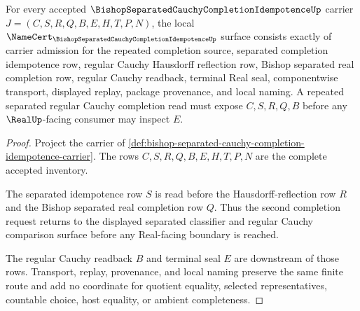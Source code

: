 \begin{theorem}
\label{thm:bishop-separated-cauchy-completion-idempotence-namecert-obligations}
For every accepted $\BishopSeparatedCauchyCompletionIdempotenceUp$ carrier $J=(C,S,R,Q,B,E,H,T,P,N)$, the local $\NameCert_{\BishopSeparatedCauchyCompletionIdempotenceUp}$ surface consists exactly of carrier admission for the repeated completion source, separated completion idempotence row, regular Cauchy Hausdorff reflection row, Bishop separated real completion row, regular Cauchy readback, terminal Real seal, componentwise transport, displayed replay, package provenance, and local naming. A repeated separated regular Cauchy completion read must expose $C,S,R,Q,B$ before any $\RealUp$-facing consumer may inspect $E$.
\end{theorem}
\begin{proof}
Project the carrier of \autoref{def:bishop-separated-cauchy-completion-idempotence-carrier}. The rows $C,S,R,Q,B,E,H,T,P,N$ are the complete accepted inventory.

The separated idempotence row $S$ is read before the Hausdorff-reflection row $R$ and the Bishop separated real completion row $Q$. Thus the second completion request returns to the displayed separated classifier and regular Cauchy comparison surface before any Real-facing boundary is reached.

The regular Cauchy readback $B$ and terminal seal $E$ are downstream of those rows. Transport, replay, provenance, and local naming preserve the same finite route and add no coordinate for quotient equality, selected representatives, countable choice, host equality, or ambient completeness.
\end{proof}

